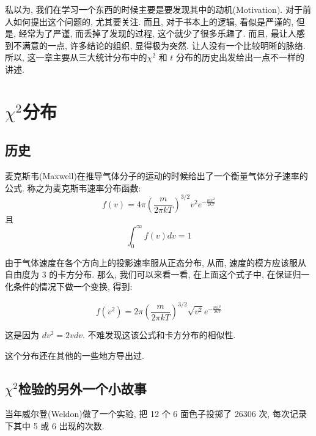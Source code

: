 		私以为, 我们在学习一个东西的时候主要是要发现其中的动机(Motivation). 对于前人如何提出这个问题的, 尤其要关注. 而且, 对于书本上的逻辑, 看似是严谨的, 但是, 经常为了严谨, 而丢掉了发现的过程, 这个就少了很多乐趣了. 而且, 最让人感到不满意的一点, 许多结论的组织, 显得极为突然. 让人没有一个比较明晰的脉络. 所以, 这一章主要从三大统计分布中的$\chi^2$ 和 $t$ 分布的历史出发给出一点不一样的讲述.
		
	\section{$\chi^2$分布}
		\subsection{历史}
			麦克斯韦(Maxwell)在推导气体分子的运动的时候给出了一个衡量气体分子速率的公式. 称之为麦克斯韦速率分布函数:
			\begin{equation}
				f(v) = 4 \pi \left(\frac{m}{2\pi kT} \right)^{3/2} v^2 e^{-\frac{mv^2}{2kT}}
			\end{equation}
			且
			\begin{equation}
				\int_0^\infty f(v) dv = 1
			\end{equation}
			
			由于气体速度在各个方向上的投影速率服从正态分布, 从而, 速度的模方应该服从自由度为 3 的卡方分布. 那么, 我们可以来看一看, 在上面这个式子中, 在保证归一化条件的情况下做一个变换, 得到:
			
			\begin{equation}
				f(v^2) = 2 \pi \left(\frac{m}{2\pi kT} \right)^{3/2} \sqrt{v^2} e^{-\frac{mv^2}{2kT}}
			\end{equation}
	
			这是因为 $dv^2 = 2vdv$. 不难发现这该公式和卡方分布的相似性.
			
			这个分布还在其他的一些地方导出过.
		\subsection{$\chi^2$检验的另外一个小故事}
			当年威尔登(Weldon)做了一个实验, 把 12 个 6 面色子投掷了 26306 次, 每次记录下其中 5 或 6 出现的次数.
			
